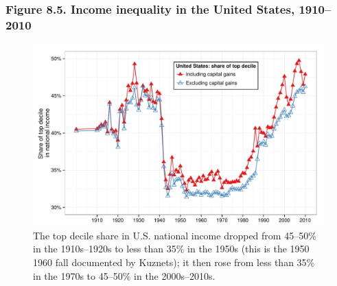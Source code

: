 \documentclass[t]{beamer}\usepackage[]{graphicx}\usepackage[]{color}
\newenvironment{knitrout}{}{} %
\begin{document}
\begin{frame}[label=Figure_8_5,fragile]
\frametitle{Figure 8.5. Income inequality in the United States, 1910--2010}
\begin{figure}[t]
\begin{minipage}[b]{\textwidth}
\centering
\begin{knitrout}\footnotesize
{}\color{fgcolor}

{\centering \includegraphics[width=1\linewidth]{figures/color/Figure_8_5} 

}



\end{knitrout}
\caption{The top decile share in U.S. national income dropped from 45--50\% in the 1910s--1920s to less than 35\% in the 1950s (this is the
1950 1960 fall documented by Kuznets); it then rose from less than 35\% in the 1970s to 45--50\% in the 2000s--2010s.}
\end{minipage}
\end{figure}
\end{frame}
\end{document}
